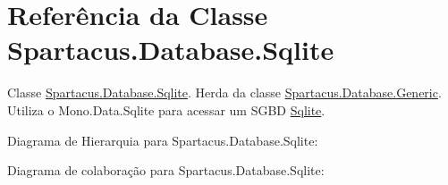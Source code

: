 \hypertarget{classSpartacus_1_1Database_1_1Sqlite}{\section{Referência da Classe Spartacus.\+Database.\+Sqlite}
\label{classSpartacus_1_1Database_1_1Sqlite}
}


Classe \hyperlink{classSpartacus_1_1Database_1_1Sqlite}{Spartacus.\+Database.\+Sqlite}. Herda da classe \hyperlink{classSpartacus_1_1Database_1_1Generic}{Spartacus.\+Database.\+Generic}. Utiliza o Mono.\+Data.\+Sqlite para acessar um S\+G\+B\+D \hyperlink{classSpartacus_1_1Database_1_1Sqlite}{Sqlite}.  




Diagrama de Hierarquia para Spartacus.\+Database.\+Sqlite\+:


Diagrama de colaboração para Spartacus.\+Database.\+Sqlite\+:
